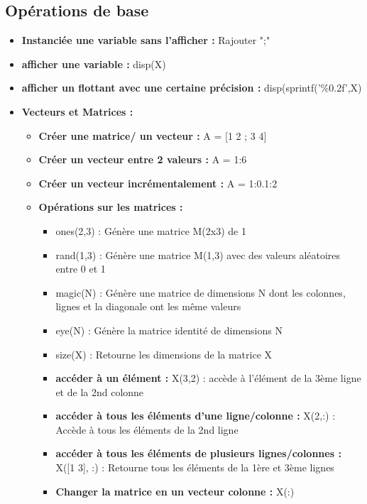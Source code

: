 \documentclass{article}
\theoremstyle{definition}
\begin{document}
\subsection{Opérations de base}
\begin{itemize}
	\item \textbf{Instanciée une variable sans l'afficher : } Rajouter ";"
	\item \textbf{afficher une variable : } disp(X)
	\item \textbf{afficher un flottant avec une certaine précision : } disp(sprintf('\%0.2f',X)
	\item \textbf{Vecteurs et Matrices : }
	\begin{itemize}
		\item \textbf{Créer une matrice/ un vecteur :} A = [1 2 ; 3 4]
		\item \textbf{Créer un vecteur entre 2 valeurs :} A = 1:6
		\item \textbf{Créer un vecteur incrémentalement  :} A = 1:0.1:2
		\item \textbf{Opérations sur les matrices :}
			\begin{itemize}
				\item ones(2,3) : Génère une matrice M(2x3) de 1
				\item rand(1,3) : Génère une matrice M(1,3) avec des valeurs aléatoires entre 0 et 1
				\item magic(N) : Génère une matrice de dimensions N dont les colonnes, lignes et la diagonale ont les même valeurs
				\item eye(N) : Génère la matrice identité de dimensions N
				\item size(X) : Retourne les dimensions de la matrice X
				\item \textbf{accéder à un élément :} X(3,2) : accède à l'élément de la 3ème ligne et de la 2nd colonne
				\item \textbf{accéder à tous les éléments d'une ligne/colonne :} X(2,:) : Accède à tous les éléments de la 2nd ligne
				\item \textbf{accéder à tous les éléments de plusieurs lignes/colonnes :} X([1 3], :) : Retourne tous les éléments de la 1ère et 3ème lignes
				\item \textbf{Changer la matrice en un vecteur colonne : } X(:)
			\end{itemize}
		

\end{itemize}
\end{itemize}
\end{document}
